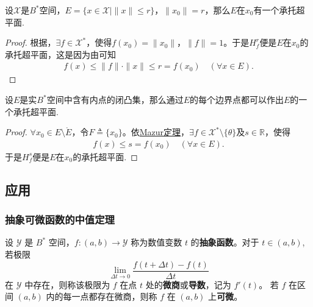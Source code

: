 \documentclass[../../main.tex]{subfiles}%
\begin{document}
\begin{example}
设$\mathscr{X}$是$B^*$空间，$E = \{ x \in \mathscr{X} \mid \|x\| \leqslant r \}$，$\|x_0\| = r$，那么$E$在$x_0$有一个承托超平面.
\end{example}
\begin{proof}
根据，$\exists f \in \mathscr{X}^*$，使得$f(x_0) = \|x_0\|$，$\|f\| = 1$。于是$H_f^r$便是$E$在$x_0$的承托超平面，这是因为由可知
\begin{align*}
f(x) \leqslant \|f\| \cdot \|x\| \leqslant r = f(x_0) \quad (\forall x \in E).
\end{align*}
\end{proof}

\begin{theorem}
设$E$是实$B^*$空间中含有内点的闭凸集，那么通过$E$的每个边界点都可以作出$E$的一个承托超平面.
\end{theorem}
\begin{proof}
$\forall x_0 \in E \setminus \mathring{E}$，令$F \triangleq \{x_0\}$。依\hyperref[corollary:泛函分析--Mazur定理]{Mazur定理}，$\exists f \in \mathscr{X}^* \setminus \{\theta\}$及$s \in \mathbb{R}$，使得
\begin{align*}
f(x) \leqslant s = f(x_0) \quad (\forall x \in E).
\end{align*}
于是$H_f^s$便是$E$在$x_0$的承托超平面.
\end{proof}

\subsection{应用}

\subsubsection{抽象可微函数的中值定理}

\begin{definition}[抽象函数的微商]
设 $\mathscr{Y}$ 是 $B^*$ 空间，$f: (a,b) \to \mathscr{Y}$ 称为数值变数 $t$ 的\textbf{抽象函数}。对于 $t \in (a,b)$,若极限
\[
\lim_{\Delta t \to 0} \frac{f(t + \Delta t) - f(t)}{\Delta t}
\]
在 $\mathscr{Y}$ 中存在，则称该极限为 $f$ 在点 $t$ 处的\textbf{微商}或\textbf{导数}，记为 $f'(t)$。
若 $f$ 在区间 $(a,b)$ 内的每一点都存在微商，则称 $f$ 在 $(a,b)$ 上\textbf{可微}。
\end{definition}
\end{document}
